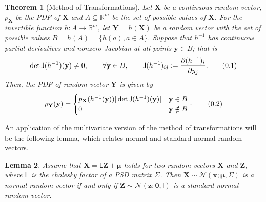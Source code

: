\documentclass[10pt]{article}
\newtheorem{thm}{Theorem}[section]
\newtheorem{lem}[thm]{Lemma}
\theoremstyle{definition}
\newcommand\eqnum{\addtocounter{equation}{1}\tag{\arabic{section}.\arabic{equation}}}
\begin{document}
\begin{thm}[Method of Transformations]\label{thm:MT:MV}
Let $\mathbf{X}$ be a continuous random vector, $p_\mathbf{X}$ be the PDF of $\mathbf{X}$ and $A\subseteq\mathbb{R}^m$ be the set of possible values of $\mathbf{X}$. For the invertible function $h:A\to\mathbb{R}^m$, let $\mathbf{Y}=h(\mathbf{X})$ be a random vector with the set of possible values $B=h(A)=\{h(a), a\in A\}$. Suppose that $h^{-1}$ has continuous partial derivatives and nonzero Jacobian at all points $\mathbf{y}\in B$; that is
\begin{equation*}
\det\mathsf{J}(h^{-1})(\mathbf{y})\ne 0, \qquad \forall \mathbf{y}\in B, \qquad \mathsf{J}(h^{-1})_{ij} := \frac{\partial (h^{-1})_i}{\partial y_j}.
\eqnum
\end{equation*}
Then, the PDF of random vector $\mathbf{Y}$ is given by
\begin{equation*}
p_{\mathbf{Y}}(\mathbf{y}) = 
\begin{cases}
p_{\mathbf{X}}(h^{-1}(\mathbf{y})) |\det\mathsf{J}(h^{-1})(\mathbf{y})| & \mathbf{y} \in B \\
0 & \mathbf{y} \notin B
\end{cases}
\cdot
\eqnum
\end{equation*}
\end{thm}
An application of the multivariate version of the method of transformations will be the following lemma, which relates normal and standard normal random vectors.
\begin{lem}
Assume that $\mathbf{X}=\mathsf{L}\mathbf{Z}+\boldsymbol{\mu}$ holds for two random vectors $\mathbf{X}$ and $\mathbf{Z}$, where $\mathsf{L}$ is the cholesky factor of a PSD matrix $\mathsf{\Sigma}$. Then $\mathbf{X}\sim\mathcal{N}(\mathbf{x};\boldsymbol{\mu},\mathsf{\Sigma})$ is a normal random vector if and only if $\mathbf{Z}\sim\mathcal{N}(\mathbf{z};\mathbf{0},\mathsf{I})$ is a standard normal random vector.
\end{lem}
\end{document}
